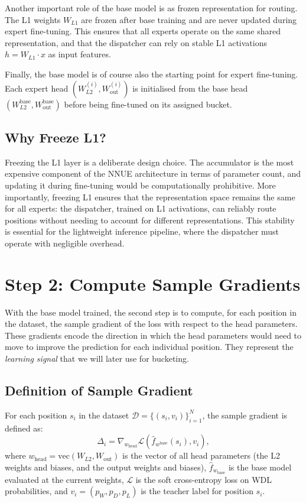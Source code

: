 Another important role of the base model is as frozen representation for routing. The L1 weights \(W_{L1}\) are frozen after base training and are never updated during expert fine-tuning. This ensures that all experts operate on the same shared representation, and that the dispatcher can rely on stable L1 activations \(h = W_{L1} \cdot x\) as input features.

Finally, the base model is of course also the starting point for expert fine-tuning. Each expert head \((W_{L2}^{(i)}, W_{\mathrm{out}}^{(i)})\) is initialised from the base head \((W_{L2}^{\mathrm{base}}, W_{\mathrm{out}}^{\mathrm{base}})\) before being fine-tuned on its assigned bucket.

\subsection{Why Freeze L1?}\label{sec:why-freeze-l1}

Freezing the L1 layer is a deliberate design choice. The accumulator is the most expensive component of the NNUE architecture in terms of parameter count, and updating it during fine-tuning would be computationally prohibitive. More importantly, freezing L1 ensures that the representation space remains the same for all experts: the dispatcher, trained on L1 activations, can reliably route positions without needing to account for different representations. This stability is essential for the lightweight inference pipeline, where the dispatcher must operate with negligible overhead.

\section{Step 2: Compute Sample Gradients}\label{sec:step-gradients}

With the base model trained, the second step is to compute, for each position in the dataset, the sample gradient of the loss with respect to the head parameters. These gradients encode the direction in which the head parameters would need to move to improve the prediction for each individual position. They represent the \emph{learning signal} that we will later use for bucketing.

\subsection{Definition of Sample Gradient}\label{sec:sg-def}

For each position \(s_i\) in the dataset \(\mathcal{D} = \{(s_i, v_i)\}_{i=1}^N\), the sample gradient is defined as:
\[
\Delta_i = \nabla_{w_{\mathrm{head}}} \mathcal{L}(\hat{f}_{w^{\mathrm{base}}}(s_i), v_i),
\]
where \(w_{\mathrm{head}} = \mathrm{vec}(W_{L2}, W_{\mathrm{out}})\) is the vector of all head parameters (the L2 weights and biases, and the output weights and biases), \(\hat{f}_{w_{\mathrm{base}}}\) is the base model evaluated at the current weights, \(\mathcal{L}\) is the soft cross-entropy loss on WDL probabilities, and \(v_i = (p_W, p_D, p_L)\) is the teacher label for position \(s_i\).

